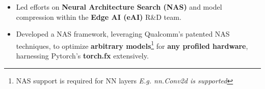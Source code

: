 \documentclass[10pt,a4paper,ragged2e,withhyper]{altacv}
\begin{document}

\begin{paracol}{2}


\makecvheader{}

\vspace{-4pt}

 

\begin{itemize}
    \item Led efforts on \textbf{Neural Architecture Search (NAS)} and model compression within the \textbf{Edge AI (eAI)} R\&D team.

    \item Developed a NAS framework, leveraging Qualcomm's patented NAS
        techniques, to optimize \textbf{arbitrary models}\footnote*{NAS support
        is required for NN layers \hspace{0.6ex} \textit{E.g. nn.Conv2d is
        supported}} for \textbf{any profiled hardware}, harnessing Pytorch's
        \textbf{torch.fx} extensively.
    

\end{itemize}
\end{paracol}
\end{document}
